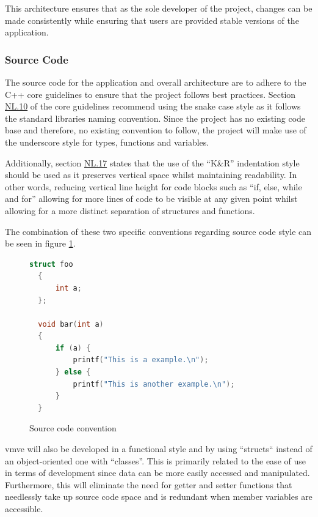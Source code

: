 \documentclass[11pt]{article}
\begin{document}
This architecture ensures that as the sole developer of the project, changes can
be made consistently while ensuring that users are provided stable versions of
the application.

\subsubsection{Source Code}
The source code for the application and overall architecture are to adhere to
the C++ core guidelines \cite{cpp-guidelines} to ensure that the project follows
best practices. Section
\href{http://isocpp.github.io/CppCoreGuidelines/CppCoreGuidelines#nl10-prefer-underscore_style-names}{NL.10}
of the core guidelines recommend using the snake case style as it follows the
standard libraries naming convention. Since the project has no existing code
base and therefore, no existing convention to follow, the project will make use
of the underscore style for types, functions and variables. 

Additionally, section
\href{https://isocpp.github.io/CppCoreGuidelines/CppCoreGuidelines#nl17-use-kr-derived-layout}{NL.17}
states that the use of the ``K\&R''  indentation style \cite{indentation} should
be used as it preserves vertical space whilst maintaining readability. In other
words, reducing vertical line height for code blocks such as ``if, else, while
and for'' allowing for more lines of code to be visible at any given point
whilst allowing for a more distinct separation of structures and functions.

The combination of these two specific conventions regarding source code style
can be seen in figure \ref{fig:convention}.

\begin{figure}[H]
\centering
\begin{lstlisting}[language=C++]
  struct foo
  {
      int a;
  };

  void bar(int a)
  {
      if (a) {
          printf("This is a example.\n");
      } else {
          printf("This is another example.\n");
      }
  }
\end{lstlisting}
\caption{Source code convention}
\label{fig:convention}
\end{figure}

\gls*{vmve} will also be developed in a functional style and by using ``structs``
instead of an object-oriented one with ``classes''. This is primarily related to
the ease of use in terms of development since data can be more easily accessed
and manipulated. Furthermore, this will eliminate the need for getter and setter
functions that needlessly take up source code space and is redundant when member
variables are accessible.
\end{document}
